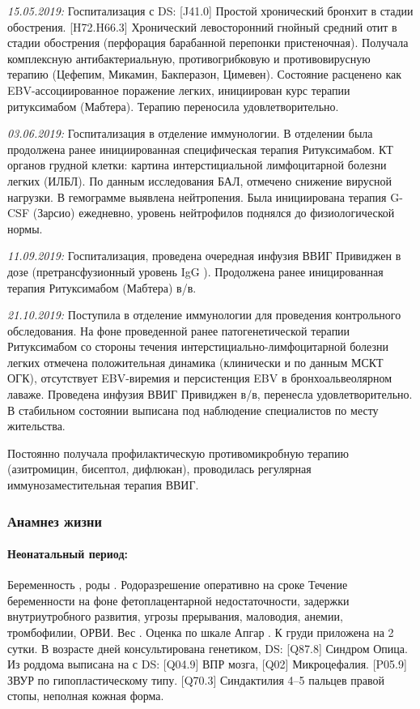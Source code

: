 \documentclass[a4paper,14pt]{extarticle}
\newcommand{\gramm}{г}
\newcommand{\grammliter}{г/л}
\newcommand{\mugpkg}{мкг/кг}
\newcommand{\mg}{мг}
\newcommand{\weeks}{нед.}
\newcommand{\pdate}[1]{\emph{#1:} }
\newcommand{\DS}[2]{[#2] #1}
\begin{document}
\pdate{15.05.2019} Госпитализация с DS: \DS{Простой хронический бронхит в стадии обострения}{J41.0}. \DS{Хронический левосторонний гнойный средний отит в стадии обострения (перфорация барабанной перепонки пристеночная)}{H72.H66.3}. Получала комплексную антибактериальную, противогрибковую и противовирусную терапию (Цефепим, Микамин, Бакперазон, Цимевен). Состояние расценено как EBV-ассоциированное поражение легких, инициирован курс терапии ритуксимабом (Мабтера). Терапию переносила удовлетворительно.

\pdate{03.06.2019} Госпитализация в отделение иммунологии. В отделении была продолжена ранее инициированная специфическая терапия Ритуксимабом. КТ органов грудной клетки: картина интерстициальной лимфоцитарной болезни легких (ИЛБЛ). По данным исследования БАЛ, отмечено снижение вирусной нагрузки. В гемограмме выявлена нейтропения. Была инициирована терапия G-CSF (Зарсио) \numprint[\mugpkg]{3} ежедневно, уровень нейтрофилов поднялся до физиологической нормы.

\pdate{11.09.2019} Госпитализация, проведена очередная инфузия ВВИГ Привиджен в дозе \numprint[\gramm]{10} (претрансфузионный уровень IgG \numprint[\grammliter]{5.8}). Продолжена ранее иницированная терапия Ритуксимабом (Мабтера) \numprint[\mg]{250} в/в. 

\pdate{21.10.2019} Поступила в отделение иммунологии для проведения контрольного обследования. На фоне проведенной ранее патогенетической терапии Ритуксимабом со стороны течения интерстициально\hyp{}лимфоцитарной болезни легких отмечена положительная динамика (клинически и по данным МСКТ ОГК), отсутствует EBV-виремия и персистенция EBV в бронхоальвеолярном лаваже. Проведена инфузия ВВИГ Привиджен \numprint[\gramm]{7,5} в/в, перенесла удовлетворительно. В стабильном состоянии выписана под наблюдение специалистов по месту жительства.

Постоянно получала профилактическую противомикробную терапию (азитромицин, бисептол, дифлюкан), проводилась регулярная иммунозаместительная терапия ВВИГ.

\subsubsection*{Анамнез жизни}

\paragraph{Неонатальный период:} Беременность , роды . Родоразрешение оперативно на сроке \numprint[\weeks]{38} Течение беременности на фоне фетоплацентарной недостаточности, задержки внутриутробного развития, угрозы прерывания, маловодия, анемии, тромбофилии, ОРВИ. Вес \numprint[\gramm]{2600}. Оценка по шкале Апгар . К груди приложена на 2 сутки. В возрасте  дней консультирована генетиком, DS: \DS{Синдром Опица}{Q87.8}. Из роддома выписана на  с DS: \DS{ВПР мозга}{Q04.9}, \DS{Микроцефалия}{Q02}. \DS{ЗВУР по гипопластическому типу}{P05.9}. \DS{Синдактилия 4--5 пальцев правой стопы, неполная кожная форма}{Q70.3}.
\end{document}

